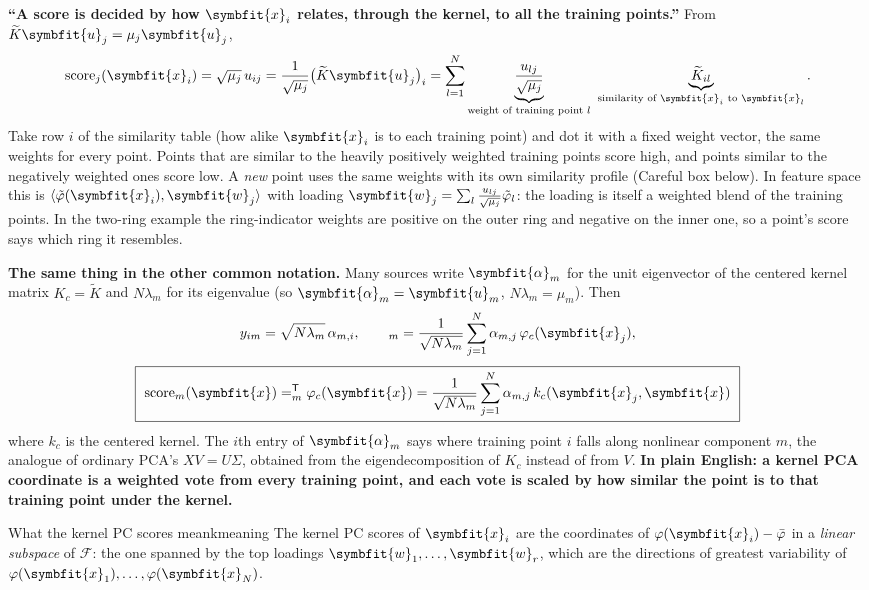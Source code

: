 \documentclass[11pt]{article}
\newcommand{\bm}[1]{\symbfit{#1}}
\newcommand{\vx}{\bm{x}}
\newcommand{\vw}{\bm{w}}
\let\vv\relax\newcommand{\vv}{\bm{v}}
\newcommand{\vu}{\bm{u}}
\newcommand{\T}{^{\mathsf T}}
\begin{document}
\begin{intuition}
\textbf{``A score is decided by how $\vx_i$ relates, through the kernel, to all the training points.''} From $\widetilde K\vu_j=\mu_j\vu_j$,
\[
\text{score}_j(\vx_i)=\sqrt{\mu_j}\,u_{ij}=\frac{1}{\sqrt{\mu_j}}\big(\widetilde K\vu_j\big)_i=\sum_{l=1}^N\underbrace{\frac{u_{lj}}{\sqrt{\mu_j}}}_{\text{weight of training point }l}\ \underbrace{\widetilde K_{il}}_{\text{similarity of }\vx_i\text{ to }\vx_l} .
\]
Take row $i$ of the similarity table (how alike $\vx_i$ is to each training point) and dot it with a fixed weight
vector, the same weights for every point. Points that are similar to the heavily positively weighted training
points score high, and points similar to the negatively weighted ones score low. A \emph{new} point uses the same weights with
its own similarity profile (Careful box below). In feature space this is $\langle\tilde\varphi(\vx_i),\vw_j\rangle$ with loading
$\vw_j=\sum_l\frac{u_{lj}}{\sqrt{\mu_j}}\tilde\varphi_l$: the loading is itself a weighted blend of the training points. In the two-ring example the
ring-indicator weights are positive on the outer ring and negative on the inner one, so a point's score says which
ring it resembles.

\textbf{The same thing in the other common notation.} Many sources write $\bm\alpha_m$ for the unit eigenvector of the centered kernel
matrix $K_c=\widetilde K$ and $N\lambda_m$ for its eigenvalue (so $\bm\alpha_m=\vu_m$, $N\lambda_m=\mu_m$). Then
\[
y_{im}=\sqrt{N\lambda_m}\,\alpha_{m,i},\qquad
\vv_m=\frac1{\sqrt{N\lambda_m}}\sum_{j=1}^N\alpha_{m,j}\,\varphi_c(\vx_j),
\]
\[
\boxed{\ \text{score}_m(\vx)=\vv_m\T\varphi_c(\vx)=\frac1{\sqrt{N\lambda_m}}\sum_{j=1}^N\alpha_{m,j}\,k_c(\vx_j,\vx)\ }
\]
where $k_c$ is the centered kernel. The $i$th entry of $\bm\alpha_m$ says where training point $i$ falls along nonlinear
component $m$, the analogue of ordinary PCA's $XV=U\Sigma$, obtained from the eigendecomposition of $K_c$ instead
of from $V$. \textbf{In plain English: a kernel PCA coordinate is a weighted vote from every training point, and
each vote is scaled by how similar the point is to that training point under the kernel.}
\end{intuition}

\begin{theorem}{What the kernel PC scores mean}{kmeaning}
The kernel PC scores of $\vx_i$ are the coordinates of $\varphi(\vx_i)-\bar{\varphi}$ in a
\emph{linear subspace} of $\mathcal F$: the one spanned by the top loadings $\vw_1,\dots,\vw_r$,
which are the directions of greatest variability of $\varphi(\vx_1),\dots,\varphi(\vx_N)$.
\end{theorem}
\end{document}
